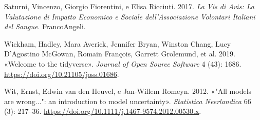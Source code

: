 \documentclass[
  italian,
  a4paper,
  a4paper,
  twoside,
  open=right,
  12pt]{scrbook}
\newlength{\cslhangindent}
\newenvironment{CSLReferences}[2] %
 {\begin{list}{}{%
  \setlength{\itemindent}{0pt}
  \setlength{\leftmargin}{0pt}
  \setlength{\parsep}{0pt}
  \ifodd #1
   \setlength{\leftmargin}{\cslhangindent}
   \setlength{\itemindent}{-1\cslhangindent}
  \fi
  \setlength{\itemsep}{#2\baselineskip}}}
 {\end{list}}
\theoremstyle{definition}
\theoremstyle{remark}
\begin{document}
\begin{CSLReferences}{1}{0}
Saturni, Vincenzo, Giorgio Fiorentini, e Elisa Ricciuti. 2017. \emph{La
Vis di Avis: La Valutazione di Impatto Economico e Sociale
dell'Associazione Volontari Italiani del Sangue}. FrancoAngeli.

Wickham, Hadley, Mara Averick, Jennifer Bryan, Winston Chang, Lucy
D'Agostino McGowan, Romain François, Garrett Grolemund, et al. 2019.
{«Welcome to the {tidyverse}»}. \emph{Journal of Open Source Software} 4
(43): 1686. \url{https://doi.org/10.21105/joss.01686}.

Wit, Ernst, Edwin van den Heuvel, e Jan-Willem Romeyn. 2012. {«"All
models are wrong...": an introduction to model uncertainty»}.
\emph{Statistica Neerlandica} 66 (3): 217--36.
\url{https://doi.org/10.1111/j.1467-9574.2012.00530.x}.

\end{CSLReferences}


\backmatter
\end{document}

